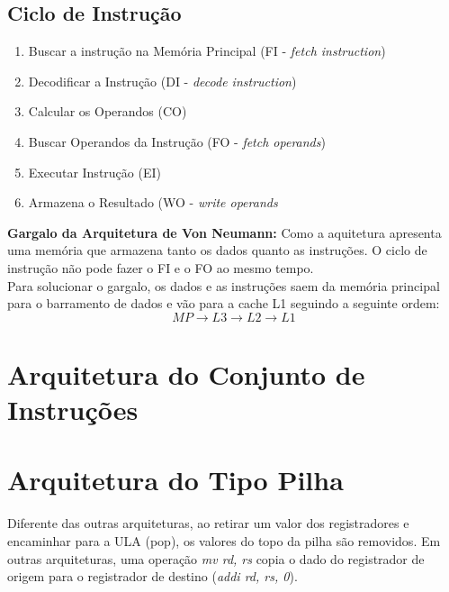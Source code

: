 \documentclass{article}
\begin{document}
		\subsection{Ciclo de Instrução}
			\begin{enumerate}
				\item Buscar a instrução na Memória Principal (FI - \textit{fetch instruction})
				\item Decodificar a Instrução (DI - \textit{decode instruction})
				\item Calcular os Operandos (CO)
				\item Buscar Operandos da Instrução (FO - \textit{fetch operands})
				\item Executar Instrução (EI)
				\item Armazena o Resultado (WO - \textit{write operands}
			\end{enumerate}
		\textbf{Gargalo da Arquitetura de Von Neumann:} Como a aquitetura apresenta uma memória que armazena tanto os dados quanto as instruções. O ciclo de instrução não pode fazer o FI e o FO ao mesmo tempo.\\
		Para solucionar o gargalo, os dados e as instruções saem da memória principal para o barramento de dados e vão para a cache L1 seguindo a seguinte ordem:
		$$MP \to L3 \to L2 \to L1$$
	\section{Arquitetura do Conjunto de Instruções}
	\section{Arquitetura do Tipo Pilha}
		Diferente das outras arquiteturas, ao retirar um valor dos registradores e encaminhar para a ULA (pop), os valores do topo da pilha são removidos. Em outras arquiteturas, uma operação \textit{mv rd, rs} copia o dado do registrador de origem para o registrador de destino (\textit{addi rd, rs, 0}).
\end{document}
